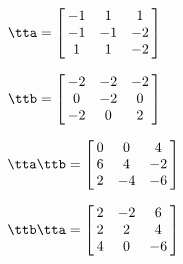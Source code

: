 {$\tta = \left[\hskip -3pt \begin{array}{ccc} -1&1&1\\  -1&-1&-2
\\  1&1&-2\end{array}\hskip -3pt \right]  $ 

$\ttb =  \left[\hskip -3pt \begin{array}{ccc} -2&-2&-2\\  0&-2&0
\\  -2&0&2\end{array}\hskip -3pt \right]  
    $}
{$\tta\ttb = \left[\hskip -3pt \begin{array}{ccc} 0&0&4\\  6&4&-2
\\  2&-4&-6\end{array}\hskip -3pt \right]   $

$\ttb\tta = \left[\hskip -3pt \begin{array}{ccc} 2&-2&6\\  2&2&4
\\  4&0&-6\end{array}\hskip -3pt \right] $ }

 
